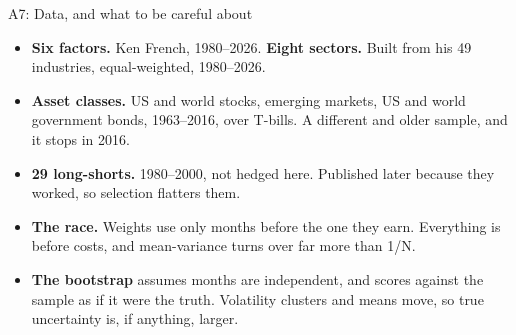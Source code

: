 \documentclass[aspectratio=169,10pt]{beamer}
\begin{document}
\begin{frame}{A7: Data, and what to be careful about}
\begin{itemize}
\item \textbf{Six factors.} Ken French, 1980--2026. \textbf{Eight sectors.} Built from his 49 industries, equal-weighted, 1980--2026.
\vskip 6pt
\item \textbf{Asset classes.} US and world stocks, emerging markets, US and world government bonds, 1963--2016, over T-bills. A different and older sample, and it stops in 2016.
\vskip 6pt
\item \textbf{29 long-shorts.} 1980--2000, not hedged here. Published later because they worked, so selection flatters them.
\vskip 6pt
\item \textbf{The race.} Weights use only months before the one they earn. Everything is before costs, and mean-variance turns over far more than 1/N.
\vskip 6pt
\item \textbf{The bootstrap} assumes months are independent, and scores against the sample as if it were the truth. Volatility clusters and means move, so true uncertainty is, if anything, larger.
\end{itemize}
\end{frame}
\end{document}

